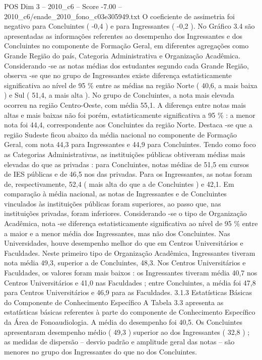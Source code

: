 \begin{textsample}{POS Dim 3 – 2010\_c6 – Score -7.00 – 2010\_c6/enade\_2010\_fono\_c03e305949.txt}
O coeficiente de assimetria foi negativo para Concluintes ( -0,4 ) e para Ingressantes ( -0,2 ).
No Gráfico 3.4 são apresentadas as informações referentes ao desempenho dos Ingressantes e dos Concluintes no componente de Formação Geral, em diferentes agregações como Grande Região do país, Categoria Administrativa e Organização Acadêmica.
Considerando -se as notas médias dos estudantes segundo cada Grande Região, observa -se que no grupo de Ingressantes existe diferença estatisticamente significativa ao nível de 95 \% entre as médias na região Norte ( 40,6, a mais baixa ) e Sul ( 51,4, a mais alta ).
No grupo de Concluintes, a nota mais elevada ocorreu na região Centro-Oeste, com média 55,1.
A diferença entre notas mais altas e mais baixas não foi porém, estatisticamente significativa a 95 \% : a menor nota foi 44,4, correspondente aos Concluintes da região Norte.
Destaca -se que a região Sudeste ficou abaixo da média nacional no componente de Formação Geral, com nota 44,3 para Ingressantes e 44,9 para Concluintes.
Tendo como foco as Categorias Administrativas, as instituições públicas obtiveram médias mais elevadas do que as privadas : para Concluintes, notas médias de 51,5 em cursos de IES públicas e de 46,5 nos das privadas.
Para os Ingressantes, as notas foram de, respectivamente, 52,4 ( mais alta do que a de Concluintes ) e 42,1.
Em comparação à média nacional, as notas de Ingressantes e de Concluintes vinculados às instituições públicas foram superiores, ao passo que, nas instituições privadas, foram inferiores.
Considerando -se o tipo de Organização Acadêmica, nota -se diferença estatisticamente significativa ao nível de 95 \% entre a maior e a menor média dos Ingressantes, mas não dos Concluintes.
Nas Universidades, houve desempenho melhor do que em Centros Universitários e Faculdades.
Neste primeiro tipo de Organização Acadêmica, Ingressantes tiveram nota média 49,3, superior a de Concluintes, 48,3.
Nos Centros Universitários e Faculdades, os valores foram mais baixos : os Ingressantes tiveram média 40,7 nos Centros Universitários e 41,0 nas Faculdades ; entre Concluintes, a média foi 47,8 para Centros Universitários e 46,9 para as Faculdades. 3.1.3 Estatísticas Básicas do Componente de Conhecimento Específico A Tabela 3.3 apresenta as estatísticas básicas referentes à parte do componente de Conhecimento Específico da Área de Fonoaudiologia.
A média do desempenho foi 40,5.
Os Concluintes apresentaram desempenho médio ( 49,3 ) superior ao dos Ingressantes ( 32,8 ) ; as medidas de dispersão – desvio padrão e amplitude geral das notas – são menores no grupo dos Ingressantes do que no dos Concluintes.

\end{textsample}
